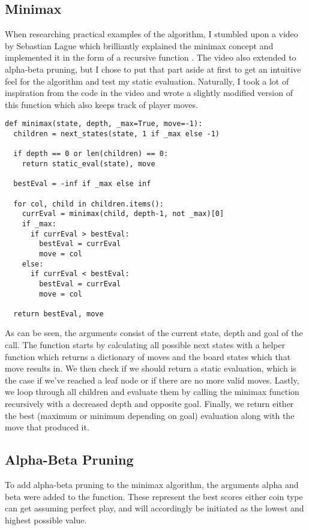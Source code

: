 \documentclass[a4paper]{article}
\begin{document}
\subsection{Minimax}
When researching practical examples of the algorithm, I stumbled upon a video by Sebastian Lague which brilliantly explained the minimax concept and implemented it in the form of a recursive function \cite{SebLag}. The video also extended to alpha-beta pruning, but I chose to put that part aside at first to get an intuitive feel for the algorithm and test my static evaluation. Naturally, I took a lot of inspiration from the code in the video and wrote a slightly modified version of this function which also keeps track of player moves.

\begin{verbatim}
def minimax(state, depth, _max=True, move=-1):
  children = next_states(state, 1 if _max else -1)

  if depth == 0 or len(children) == 0:
    return static_eval(state), move

  bestEval = -inf if _max else inf
  
  for col, child in children.items():
    currEval = minimax(child, depth-1, not _max)[0]
    if _max:
      if currEval > bestEval:
        bestEval = currEval
        move = col
    else:
      if currEval < bestEval:
        bestEval = currEval
        move = col

  return bestEval, move
\end{verbatim}

As can be seen, the arguments consist of the current state, depth and goal of the call. The function starts by calculating all possible next states with a helper function which returns a dictionary of moves and the board states which that move results in. We then check if we should return a static evaluation, which is the case if we've reached a leaf node or if there are no more valid moves. Lastly, we loop through all children and evaluate them by calling the minimax function recursively with a decreased depth and opposite goal. Finally, we return either the best (maximum or minimum depending on goal) evaluation along with the move that produced it.

\subsection{Alpha-Beta Pruning}
To add alpha-beta pruning to the minimax algorithm, the arguments alpha and beta were added to the function. These represent the best scores either coin type can get assuming perfect play, and will accordingly be initiated as the lowest and highest possible value.
\end{document}
